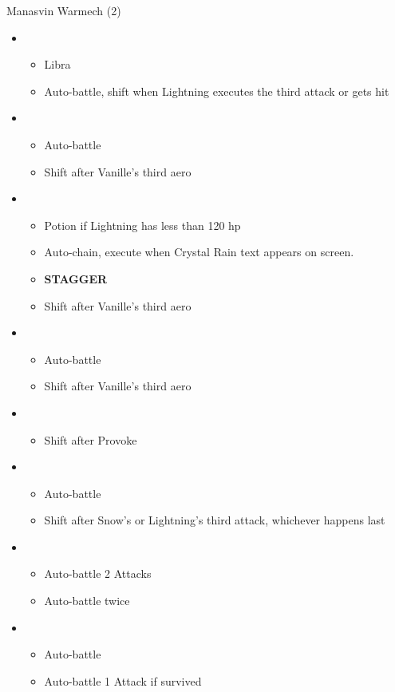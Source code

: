 \begin{multicols}{2}
	\begin{battle}[0:50]{Manasvin Warmech (2)}
		\begin{itemize}
			\item \third
			      \begin{itemize}
				      \item Libra
				      \item Auto-battle, shift when Lightning executes the third attack or gets hit
			      \end{itemize}
			\item \fourth
			      \begin{itemize}
				      \item Auto-battle
				      \item Shift after Vanille's third aero
			      \end{itemize}
			\item \first
			      \begin{itemize}
				      \item Potion if Lightning has less than 120 hp
				      \item Auto-chain, execute when Crystal Rain text appears on screen.
				      \item \textbf{STAGGER}
				      \item Shift after Vanille's third aero
			      \end{itemize}
			\item \third
			      \begin{itemize}
				      \item Auto-battle
				      \item Shift after Vanille's third aero
			      \end{itemize}
			\item \second
			      \begin{itemize}
				      \item Shift after Provoke
			      \end{itemize}
			\item \third
			      \begin{itemize}
				      \item Auto-battle
				      \item Shift after Snow's or Lightning's third attack, whichever happens last
			      \end{itemize}
			\item \fourth
			      \begin{itemize}
				      \item Auto-battle 2 Attacks
				      \item Auto-battle twice
			      \end{itemize}
			\item \third
			      \begin{itemize}
				      \item Auto-battle
				      \item Auto-battle 1 Attack if survived
			      \end{itemize}
		\end{itemize}
	\end{battle}


\end{multicols}
